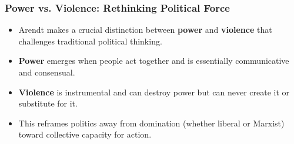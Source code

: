\documentclass{beamer}
\begin{document}
\begin{frame}
\frametitle{Power vs. Violence: Rethinking Political Force}
\begin{itemize}
    \item Arendt makes a crucial distinction between \textbf{power} and \textbf{violence} that challenges traditional political thinking.
    \item \textbf{Power} emerges when people act together and is essentially communicative and consensual.
    \item \textbf{Violence} is instrumental and can destroy power but can never create it or substitute for it.
    \item This reframes politics away from domination (whether liberal or Marxist) toward collective capacity for action.
\end{itemize}

\begin{center}
\end{center}
\end{frame}
\end{document}

